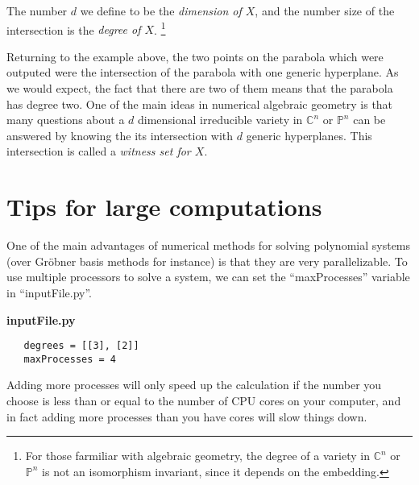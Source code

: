 \documentclass[12pt]{article}
\theoremstyle{definition}
\newcommand{\C}{\mathbb{C}}
\newcommand{\PP}{\mathbb{P}}
\begin{document}
The number $d$ we define to be the \emph{dimension of $X$}, and the number size 
of the intersection is the \emph{degree of $X$}. \footnote{For those 
farmiliar with algebraic geometry, the degree of 
a variety in $\C^n$ or $\PP^n$ is not an isomorphism invariant, since it 
depends on the embedding.}

Returning to the example above, the two points on the parabola which 
were outputed were the intersection of the parabola with one generic 
hyperplane. As we would expect, the fact that there are two of them 
means that the parabola has degree two. One of the main ideas 
in numerical algebraic geometry is that many questions about a $d$ 
dimensional irreducible variety in $\C^n$ or $\PP^n$ can be answered by knowing the 
its intersection with $d$ generic hyperplanes. This intersection is 
called a \emph{witness set for $X$}. 


\section{Tips for large computations}

One of the main advantages of numerical methods for solving polynomial 
systems (over Gr\"{o}bner basis methods for instance) is that they are 
very parallelizable. To use multiple processors to solve a system, we 
can set the ``maxProcesses'' variable in ``inputFile.py''.

\noindent \textbf{inputFile.py}
\begin{leftbar}
\vspace{-10pt} 
\begin{verbatim}
   degrees = [[3], [2]]
   maxProcesses = 4
\end{verbatim}\vspace{-10pt} 
\end{leftbar}

Adding more processes will only speed up the calculation if the number 
you choose is less than or equal to the number of CPU cores on your 
computer, and in fact adding more processes than you have cores will 
slow things down.
\end{document}
